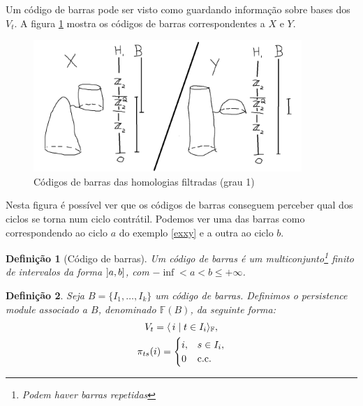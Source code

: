 \documentclass[11pt]{article}
\newtheorem{definition}{Definição}
\theoremstyle{nonumberplain}
\newcommand{\FF}{\mathbb{F}}
\DeclarePairedDelimiter{\braket}{\langle}{\rangle}
\begin{document}
Um código de barras pode ser visto como guardando informação sobre bases dos $V_t$. A figura \ref{bc1} mostra os códigos de barras correspondentes a $X$ e $Y$.
\begin{figure}[H]
\centering
\includegraphics[height=5cm]{bc1}
\caption{Códigos de barras das homologias filtradas (grau 1)}\label{bc1}
\end{figure}

Nesta figura é possível ver que os códigos de barras conseguem perceber qual dos ciclos se torna num ciclo contrátil. Podemos ver uma das barras como correspondendo ao ciclo $a$ do exemplo \ref{exxy} e a outra ao ciclo $b$.

\begin{definition}[Código de barras]
Um código de barras é um multiconjunto\footnote{Podem haver barras repetidas} finito de intervalos da forma $\linterval a b$, com $-\inf < a < b \leq +\infty$.
\end{definition}

\begin{definition}
Seja $B = \{I_1, \dots, I_k\}$ um código de barras. Definimos o \emph{persistence module associado a $B$}, denominado $\FF(B)$, da seguinte forma:
\begin{gather}
V_t = \braket{\,i \mid t \in I_i}_\FF,\\
\pi_{ts}(i) = \begin{cases} i, & s \in I_i,\\ 0 & \text{c.c.} \end{cases}
\end{gather}
\end{definition}
\end{document}
